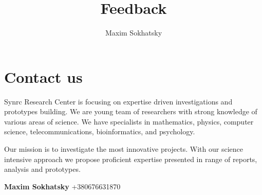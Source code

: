 \documentclass[11pt]{article}
\begin{document}

\title{Feedback}
\author{Maxim Sokhatsky}


\section*{Contact us}

Synrc Research Center is focusing on expertise driven
investigations and prototypes building. We are young
team of researchers with strong knowledge of various
areas of science. We have specialists in mathematics,
physics, computer science, telecommunications,
bioinformatics, and psychology.

Our mission is to investigate the most innovative
projects. With our science intensive approach we
propose proficient expertise presented in range of
reports, analysis and prototypes.

\textbf{Maxim Sokhatsky}  +380676631870


\end{document}
